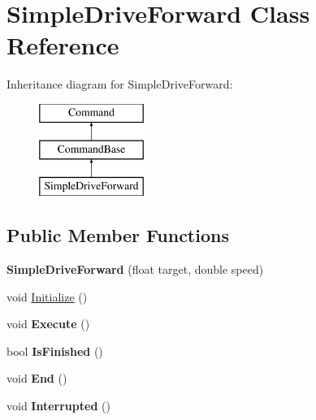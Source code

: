 \hypertarget{class_simple_drive_forward}{}\section{Simple\+Drive\+Forward Class Reference}
\label{class_simple_drive_forward}
Inheritance diagram for Simple\+Drive\+Forward\+:\begin{figure}[H]
\begin{center}
\leavevmode
\includegraphics[height=3.000000cm]{class_simple_drive_forward}
\end{center}
\end{figure}
\subsection*{Public Member Functions}
\begin{DoxyCompactItemize}
\item 
\hypertarget{class_simple_drive_forward_a353c4a8d47bc147f7ac3b38185285ede}{}{\bfseries Simple\+Drive\+Forward} (float target, double speed)\label{class_simple_drive_forward_a353c4a8d47bc147f7ac3b38185285ede}

\item 
void \hyperlink{class_simple_drive_forward_a7735d50a6fb897e7ed3a8d67ce5c94b1}{Initialize} ()
\item 
\hypertarget{class_simple_drive_forward_a4e7639c1b9ae203bfb7e1503ff5c844f}{}void {\bfseries Execute} ()\label{class_simple_drive_forward_a4e7639c1b9ae203bfb7e1503ff5c844f}

\item 
\hypertarget{class_simple_drive_forward_a0ec912296de959f11018bdaf5c601279}{}bool {\bfseries Is\+Finished} ()\label{class_simple_drive_forward_a0ec912296de959f11018bdaf5c601279}

\item 
\hypertarget{class_simple_drive_forward_a84d83725f3f380f3b1e7f38fd1f2eeb7}{}void {\bfseries End} ()\label{class_simple_drive_forward_a84d83725f3f380f3b1e7f38fd1f2eeb7}

\item 
\hypertarget{class_simple_drive_forward_a7fe9963981143ec53dc96949b34c6acc}{}void {\bfseries Interrupted} ()\label{class_simple_drive_forward_a7fe9963981143ec53dc96949b34c6acc}

\end{DoxyCompactItemize}
